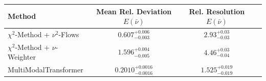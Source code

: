     \begin{tabular}{lccc}
        \toprule
        Method & Mean Rel. Deviation $E(\bar{\nu})$ & Rel. Resolution $E(\bar{\nu})$ \\
        \midrule
        $\chi^2$-Method + $\nu^2$-Flows & $0.607^{+0.006}_{-0.003}$ & $2.93^{+0.03}_{-0.03}$ \\
        $\chi^2$-Method + $\nu$-Weighter & $1.596^{+0.004}_{-0.005}$ & $4.46^{+0.03}_{-0.04}$ \\
        MultiModalTransformer & $0.2010^{+0.0016}_{-0.0016}$ & $1.525^{+0.019}_{-0.019}$ \\
        \bottomrule
    \end{tabular}
